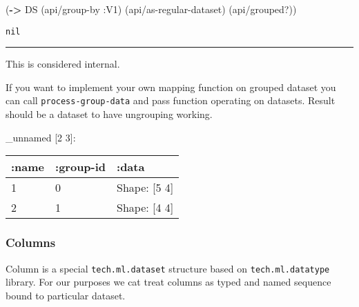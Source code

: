 \documentclass[]{article}
\newenvironment{Shaded}{\begin{snugshade}}{\end{snugshade}}
\newcommand{\KeywordTok}[1]{\textcolor[rgb]{0.13,0.29,0.53}{\textbf{#1}}}
\newcommand{\StringTok}[1]{\textcolor[rgb]{0.31,0.60,0.02}{#1}}
\newcommand{\VariableTok}[1]{\textcolor[rgb]{0.00,0.00,0.00}{#1}}
\newcommand{\AttributeTok}[1]{\textcolor[rgb]{0.77,0.63,0.00}{#1}}
\newcommand{\NormalTok}[1]{#1}
\begin{document}
\begin{Shaded}
\begin{Highlighting}[]
\NormalTok{(}\KeywordTok{->}\NormalTok{ DS}
\NormalTok{    (api/group-by }\AttributeTok{:V1}\NormalTok{)}
\NormalTok{    (api/as-regular-dataset)}
\NormalTok{    (api/grouped?))}
\end{Highlighting}
\end{Shaded}

\begin{verbatim}
nil
\end{verbatim}

\begin{center}\rule{0.5\linewidth}{0.5pt}\end{center}

This is considered internal.

If you want to implement your own mapping function on grouped dataset
you can call \texttt{process-group-data} and pass function operating on
datasets. Result should be a dataset to have ungrouping working.

\begin{Shaded}
\end{Shaded}

\_unnamed {[}2 3{]}:

\begin{longtable}[]{@{}lll@{}}
\toprule
:name & :group-id & :data\tabularnewline
\midrule
\endhead
1 & 0 & Shape: {[}5 4{]}\tabularnewline
2 & 1 & Shape: {[}4 4{]}\tabularnewline
\bottomrule
\end{longtable}

\subsubsection{Columns}\label{columns}

Column is a special \texttt{tech.ml.dataset} structure based on
\texttt{tech.ml.datatype} library. For our purposes we cat treat columns
as typed and named sequence bound to particular dataset.
\end{document}
